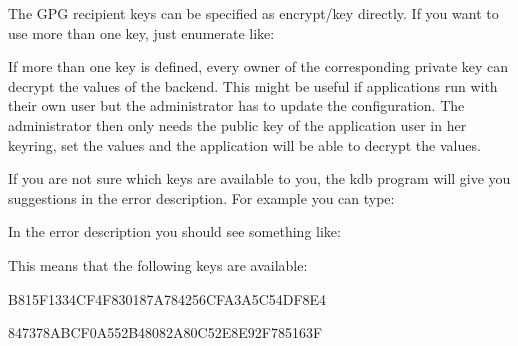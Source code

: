 \begin{DoxyCode}{0}
\end{DoxyCode}


The G\+PG recipient keys can be specified as {\ttfamily encrypt/key} directly. If you want to use more than one key, just enumerate like\+:


\begin{DoxyCode}{0}
\end{DoxyCode}


If more than one key is defined, every owner of the corresponding private key can decrypt the values of the backend. This might be useful if applications run with their own user but the administrator has to update the configuration. The administrator then only needs the public key of the application user in her keyring, set the values and the application will be able to decrypt the values.

If you are not sure which keys are available to you, the {\ttfamily kdb} program will give you suggestions in the error description. For example you can type\+:


\begin{DoxyCode}{0}
\end{DoxyCode}


In the error description you should see something like\+:


\begin{DoxyCode}{0}
\end{DoxyCode}


This means that the following keys are available\+:


\begin{DoxyItemize}
\item B815\+F1334\+C\+F4\+F830187\+A784256\+C\+F\+A3\+A5\+C54\+D\+F8\+E4
\item 847378A\+B\+C\+F0\+A552\+B48082\+A80\+C52\+E8\+E92\+F785163F
\end{DoxyItemize}

